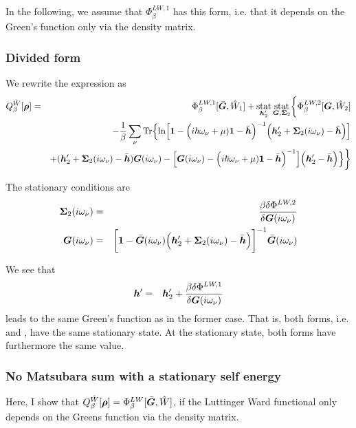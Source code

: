 \documentclass[11pt,a4paper]{report}
\begin{document}
In the following, we assume that $\Phi^{LW,1}_\beta$ has this form,
i.e. that it depends on the Green's function only via the density
matrix.

\subsubsection{Divided form}
We rewrite the expression as
\begin{eqnarray}
Q^{\hat{W}}_\beta[\bm{\rho}]
&=&
\Phi^{LW,1}_\beta[\bar{\bm{G}},\hat{W}_1]+
\operatorname*{stat}_{\bm{h}'_2}\operatorname*{stat}_{\bm{G},\bm{\Sigma}_2}
\biggl\lbrace
\Phi^{LW,2}_\beta[\bm{G},\hat{W}_2]
\nonumber\\
&&-\frac{1}{\beta}\sum_\nu\mathrm{Tr}\Bigl\lbrace
\ln\Bigl[
\bm{1}-
\Bigl(i\hbar\omega_\nu+\mu)\bm{1}-\bar{\bm{h}}\Bigr)^{-1}
\Bigl(\bm{h}'_2+\bm{\Sigma}_2(i\omega_\nu)-\bar{\bm{h}}\Bigr)
\Bigr]
\nonumber\\&&
+(\bm{h}'_2+\bm{\Sigma}_2(i\omega_\nu)-\bar{\bm{h}})\bm{G}(i\omega_\nu)
-
\Bigl[
\bm{G}(i\omega_\nu)
-\Bigl(i\hbar\omega_\nu+\mu)\bm{1}-\bar{\bm{h}}\Bigr)^{-1}
\Bigr]
\Bigl(\bm{h}'_2-\bar{\bm{h}}\Bigr)\Bigr\rbrace
\biggr\rbrace
\nonumber\\
\label{eq:dmfQgreenafterdivision}
\end{eqnarray}

The stationary conditions are
\begin{eqnarray}
\bm{\Sigma}_2(i\omega_\nu)
&=&\frac{\beta\delta\Phi^{LW,2}}{\delta\bm{G}(i\omega_\nu)}
\nonumber\\
\bm{G}(i\omega_\nu)&=&\biggl[\bm{1}-\bar{\bm{G}}(i\omega_\nu)
\Bigl(\bm{h}'_2
+\bm{\Sigma}_2(i\omega_\nu)-\bar{\bm{h}}\Bigr)\biggr]^{-1}
\bar{\bm{G}}(i\omega_\nu)
\end{eqnarray}

We see that 
\begin{eqnarray}
\bm{h}'&=&
\bm{h}'_2+
\frac{\beta\delta\Phi^{LW,1}}{\delta\bm{G}(i\omega_\nu)}
\end{eqnarray}
leads to the same Green's function as in the former case. That is,
both forms, i.e.  and
, have the same stationary state.  At
the stationary state, both forms have furthermore the same value.

\subsubsection{No Matsubara sum with a stationary self energy}
Here, I show that
$Q^{\hat{W}}_\beta[\bm{\rho}]=\Phi^{LW}_\beta[\bar{\bm{G}},\hat{W}]$,
if the Luttinger Ward functional only depends on the Greens function
via the density matrix.
\end{document}
